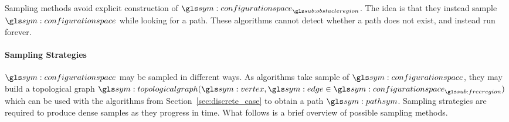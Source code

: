 			Sampling methods avoid explicit construction of
			$\configurationspace_{\obstacleregion}$. The idea is that they
			instead sample $\configurationspace$ while looking for a path. These
			algorithms cannot detect whether a path does not exist, and instead
			run forever.

			\paragraph{Sampling Strategies}%
			\label{sec:sampling_strategies}

				$\configurationspace$ may be sampled in different ways. As
				algorithms take sample of $\configurationspace$, they may build
				a topological graph \( \topologicalgraph(\vertex, \edge \in
				\configurationspace_{\freeregion}) \) which can be used with the
				algorithms from Section~\ref{sec:discrete_case} to obtain a path
				$\pathsym$.  Sampling strategies are required to produce dense
				samples as they progress in time.  What follows is a brief
				overview of possible sampling methods.

